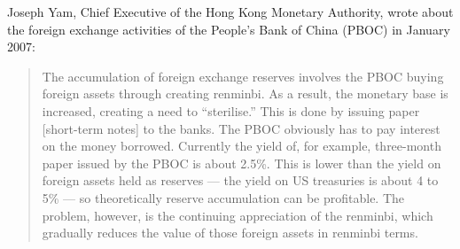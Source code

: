 \documentclass[letterpaper,12pt]{exam}
\begin{document}
\begin{questions}
Joseph Yam, Chief Executive of the Hong Kong Monetary Authority, wrote about the foreign exchange activities of the People's Bank of China (PBOC) in January 2007:
%
\begin{quote}
The accumulation of foreign exchange reserves
involves the PBOC buying foreign assets through creating renminbi.
As a result, the monetary base is increased, creating a need to ``sterilise.''
This is done by issuing paper [short-term notes] to the banks.
The PBOC obviously has to pay interest on the money borrowed.
Currently the yield of, for example, three-month paper issued by the PBOC is about 2.5\%.
This is lower than the yield on foreign assets held as reserves ---
the yield on US treasuries is about 4 to 5\% --- so theoretically
reserve accumulation can be profitable.
The problem, however, is the continuing appreciation of the renminbi,
which gradually reduces the value of those foreign assets in renminbi terms.
\end{quote}


\begin{solution}
\begin{parts}

\end{parts}
\end{solution}
\end{questions}
\end{document}
